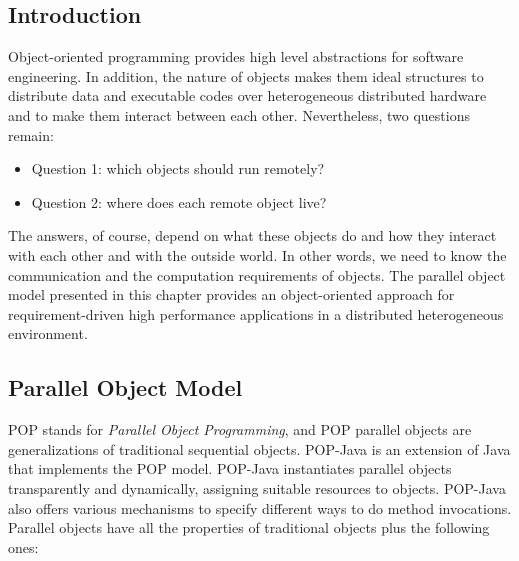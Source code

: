 \label{popmodel}
\subsection{Introduction}
Object-oriented programming provides high level abstractions for software
engineering. In addition, the nature of objects makes them ideal
structures to distribute data and executable codes over heterogeneous
distributed hardware and to make them interact between each other.
Nevertheless, two questions remain:

\begin{itemize}

\item Question 1: which objects should run remotely?

\item Question 2: where does each remote object live?

\end{itemize}

The answers, of course, depend on what these objects do and how
they interact with each other and with the outside world. In other
words, we need to know the communication and the computation
requirements of objects. The parallel object model presented in this
chapter provides an object-oriented approach for requirement-driven high
performance applications in a distributed heterogeneous environment.


\subsection{Parallel Object Model}
POP stands for {\it Parallel Object Programming}, and POP parallel objects are
generalizations of traditional sequential objects. POP-Java is an
extension of Java that implements the POP model. POP-Java instantiates
parallel objects transparently and dynamically, assigning suitable
resources to objects. POP-Java also offers various mechanisms to specify
different ways to do method invocations. Parallel objects have all the properties
of traditional objects plus the following ones:

